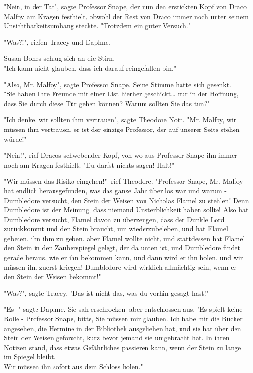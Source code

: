 {"Nein, in der Tat", sagte Professor Snape, der nun den erstickten Kopf von Draco Malfoy am Kragen festhielt, obwohl der Rest von Draco immer noch unter seinem Unsichtbarkeitsumhang steckte. "Trotzdem ein guter Versuch."

"Was?!", riefen Tracey und Daphne.

Susan Bones schlug sich an die Stirn.\\ "Ich kann nicht glauben, dass ich darauf reingefallen bin."

"Also, Mr. Malfoy", sagte Professor Snape. Seine Stimme hatte sich gesenkt.\\ "Sie haben Ihre Freunde mit einer List hierher geschickt… nur in der Hoffnung, dass Sie durch diese Tür gehen können? Warum sollten Sie das tun?"

"Ich denke, wir sollten ihm vertrauen", sagte Theodore Nott. "Mr. Malfoy, wir müssen ihm vertrauen, er ist der einzige Professor, der auf unserer Seite stehen würde!"

"Nein!", rief Dracos schwebender Kopf, von wo aus Professor Snape ihn immer noch am Kragen festhielt. "Du darfst nichts sagen! Halt!"

"Wir müssen das Risiko eingehen!", rief Theodore. "Professor Snape, Mr. Malfoy hat endlich herausgefunden, was das ganze Jahr über los war und warum - Dumbledore versucht, den Stein der Weisen von Nicholas Flamel zu stehlen! Denn Dumbledore ist der Meinung, dass niemand Unsterblichkeit haben sollte! Also hat Dumbledore versucht, Flamel davon zu überzeugen, dass der Dunkle Lord zurückkommt und den Stein braucht, um wiederzubeleben, und hat Flamel gebeten, ihn ihm zu geben, aber Flamel wollte nicht, und stattdessen hat Flamel den Stein in den Zauberspiegel gelegt, der da unten ist, und Dumbledore findet gerade heraus, wie er ihn bekommen kann, und dann wird er ihn holen, und wir müssen ihn zuerst kriegen! Dumbledore wird wirklich allmächtig sein, wenn er den Stein der Weisen bekommt!"

"Was?", sagte Tracey. "Das ist nicht das, was du vorhin gesagt hast!"

"Es -" sagte Daphne. Sie sah erschrocken, aber entschlossen aus. "Es spielt keine Rolle - Professor Snape, bitte, Sie müssen mir glauben. Ich habe mir die Bücher angesehen, die Hermine in der Bibliothek ausgeliehen hat, und sie hat über den Stein der Weisen geforscht, kurz bevor jemand sie umgebracht hat. In ihren Notizen stand, dass etwas Gefährliches passieren kann, wenn der Stein zu lange im Spiegel bleibt.\\ Wir müssen ihn sofort aus dem Schloss holen."

}
